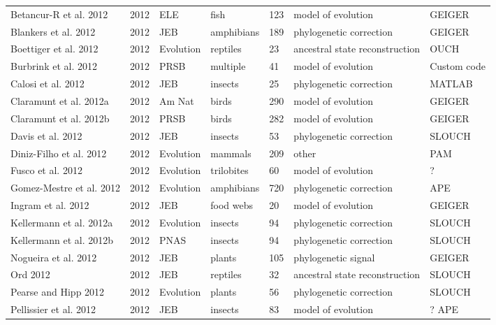 \documentclass[a4paper,12pt]{article}
\begin{document}
\begin{landscape}
\begin{center}
\begin{longtable}{p{6cm}llllll}
Betancur-R et al. 2012    &   2012    &   ELE &   fish    &   123 &   model of evolution  &   GEIGER  \\
Blankers et al. 2012  &   2012    &   JEB &   amphibians  &   189 &   phylogenetic correction &   GEIGER  \\
Boettiger et al. 2012 &   2012    &   Evolution   &   reptiles    &   23  &   ancestral state reconstruction  &   OUCH    \\
Burbrink et al. 2012  &   2012    &   PRSB    &   multiple    &   41  &   model of evolution  &   Custom code \\
Calosi et al. 2012    &   2012    &   JEB &   insects &   25  &   phylogenetic correction &   MATLAB  \\
Claramunt et al. 2012a    &   2012    &   Am Nat  &   birds   &   290 &   model of evolution  &   GEIGER  \\
Claramunt et al. 2012b    &   2012    &   PRSB    &   birds   &   282 &   model of evolution  &   GEIGER  \\
Davis et al. 2012 &   2012    &   JEB &   insects &   53  &   phylogenetic correction &   SLOUCH  \\
Diniz-Filho et al. 2012   &   2012    &   Evolution   &   mammals &   209 &   other   &   PAM \\
Fusco et al. 2012 &   2012    &   Evolution   &   trilobites  &   60  &   model of evolution  &   ?   \\
Gomez-Mestre et al. 2012  &   2012    &   Evolution   &   amphibians  &   720 &   phylogenetic correction &   APE \\
Ingram et al. 2012    &   2012    &   JEB &   food webs   &   20  &   model of evolution  &   GEIGER  \\
Kellermann et al. 2012a   &   2012    &   Evolution   &   insects &   94  &   phylogenetic correction &   SLOUCH  \\
Kellermann et al. 2012b   &   2012    &   PNAS    &   insects &   94  &   phylogenetic correction &   SLOUCH  \\
Nogueira et al. 2012  &   2012    &   JEB &   plants  &   105 &   phylogenetic signal &   GEIGER  \\
Ord 2012  &   2012    &   JEB &   reptiles    &   32  &   ancestral state reconstruction  &   SLOUCH  \\
Pearse and Hipp 2012  &   2012    &   Evolution   &   plants  &   56  &   phylogenetic correction &   SLOUCH  \\
Pellissier et al. 2012    &   2012    &   JEB &   insects &   83  &   model of evolution  &   ? APE \\

\end{longtable}
\end{center}
\end{landscape}
\end{document}
